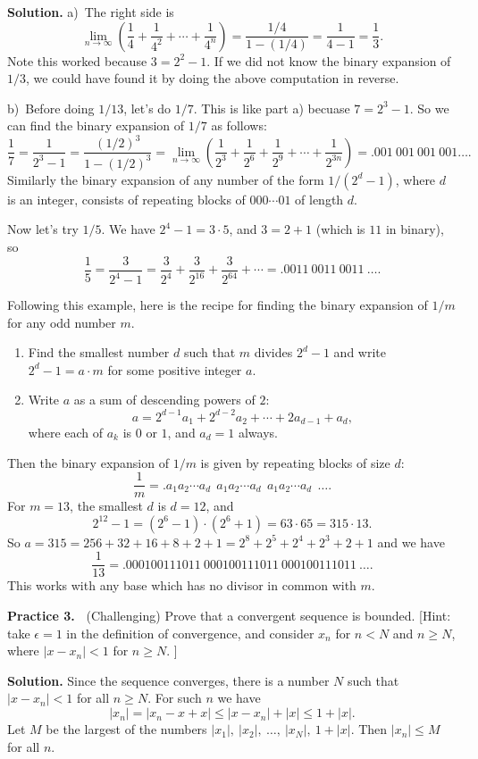 \documentclass[12pt]{article}
\newcommand{\ep}{\epsilon}
\theoremstyle{definition}
\theoremstyle{remark}
\theoremstyle{definition}
\newenvironment{Solution}{\noindent\textbf{Solution.}}{}
\begin{document}
\begin{Solution} 
a)\ The right side is 
\[\lim_{n\to\infty}\left(\frac{1}{4}+\frac{1}{4^2}+\cdots+\frac{1}{4^n}\right)
=\frac{1/4}{1-(1/4)}=\frac{1}{4-1}=\frac{1}{3}.
\]
Note this worked because $3=2^2-1$. If we did not know the binary expansion of $1/3$, we could have found it by doing the above computation in reverse. 

b)\ Before doing $1/13$, let's do $1/7$. This is like part a) becuase $7=2^3-1$. So  we can find the binary expansion of $1/7$ as follows:
\[\frac{1}{7}=\frac{1}{2^3-1}=\frac{(1/2)^3}{1-(1/2)^3}=
\lim_{n\to\infty}\left(\frac{1}{2^3}+\frac{1}{2^6}+\frac{1}{2^9}+\cdots+\frac{1}{2^{3n}}\right)=.001\ 001\ 001\ 001\dots.
\]
Similarly the binary expansion of any number of the form $1/(2^d-1)$, where $d$ is an integer, consists of repeating blocks of $000\cdots 01$ of length $d$. 

Now let's try $1/5$. We have $2^4-1=3\cdot 5$, and $3=2+1$ (which is $11$ in binary), so 
\[\frac{1}{5}=\frac{3}{2^4-1}=\frac{3}{2^4}+\frac{3}{2^{16}}+\frac{3}{2^{64}}+\cdots =.0011\ 0011\ 0011\ \dots.\]

Following this example, here is the recipe for finding the binary expansion of $1/m$ for any odd number $m$. 
\begin{enumerate}
\item Find  the smallest number $d$ such that $m$ divides $2^d-1$ and write $2^{d}-1=a\cdot m$ for some positive integer $a$. 
\item Write $a$ as a sum of descending powers of $2$: 
\[a=2^{d-1}a_1+2^{d-2}a_2+\cdots +2a_{d-1}+a_d,\]
where each of $a_k$ is $0$ or $1$, and $a_d=1$ always. 
\end{enumerate}
Then the binary expansion of $1/m$ is given by  repeating blocks of size $d$:
\[\frac{1}{m}=
.a_1a_2\cdots a_{d}\  \ a_1a_2\cdots a_d\ \ a_1a_2\cdots a_d\ \ 
\dots.
\]
For $m=13$, the smallest $d$ is $d=12$, and 
\[2^{12}-1=(2^6-1)\cdot (2^6+1)=63\cdot 65=315\cdot 13.\]
So $a=315=256+32+16+8+2+1=2^8+2^5+2^4+2^3+2+1$ and we have 
\[
\frac{1}{13}=.000100111011\ 000100111011\ 000100111011\ \dots.
\]
This works with any base which has no divisor in common with $m$.
\end{Solution}

{\bf Practice 3.\ } (Challenging) Prove that a convergent sequence is bounded. 
[Hint: take $\ep=1$ in the definition of convergence, and consider $x_n$ for $n< N$ and $n\geq N$, where $|x-x_n |<1$ for $n\geq N$. ]

\begin{Solution} Since the sequence converges, there is a number $N$ such that $|x-x_n|<1$ for all $n\geq N$. For such $n $ we have 
\[|x_n|=|x_n-x+x|\leq |x-x_n|+|x|\leq 1+|x|.\]
Let $M$ be the largest of the numbers 
$|x_1|,\  |x_2|,\  \dots,\  |x_N|,\  1+|x|$. Then $|x_n|\leq M$ for all $n$.  
\end{Solution}
\end{document}
